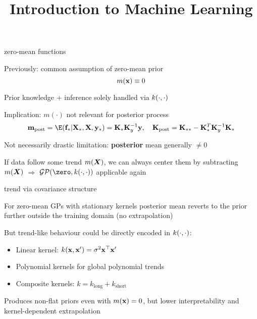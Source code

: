 \documentclass[11pt,compress,t,notes=noshow, xcolor=table]{beamer}
\title{Introduction to Machine Learning}
\begin{document}


\begin{framei}[sep=L]{zero-mean functions}
\item Previously: common assumption of zero-mean prior $$m(\mathbf{x}) \equiv 0$$
\item Prior knowledge + inference solely handled via $k(\cdot, \cdot)$
\item Implication: $m(\cdot)$ not relevant for posterior process
$$\mv_{\text{post}} = \E(\fs | \Xs, \Xmat, \ys) = \Ks \Ky^{-1} \yv, \quad \Kmat_{\text{post}} = \Kss - \Ks^T \Ky^{-1} \Ks$$
\item Not necessarily drastic limitation: \textbf{posterior} mean generally $\neq 0$
\item If data follow some trend $m(\bm{X})$, we can always center them by subtracting $m(\bm{X})$ $\Rightarrow$ $\GPzk$ applicable again
\end{framei}



\begin{framei}[sep=S]{trend via covariance structure}
\item For zero-mean GPs with stationary kernels posterior mean reverts to the prior further outside the training domain (no extrapolation)
\item But trend-like behaviour could be directly encoded in $k(\cdot, \cdot)$:
\begin{itemize}
  \item Linear kernel: $k(\mathbf{x},\mathbf{x}')=\sigma^2 \mathbf{x}^\top \mathbf{x}'$
  \item Polynomial kernels for global polynomial trends
  \item Composite kernels: $k = k_{\text{long}} + k_{\text{short}}$
\end{itemize}
\item Produces non-flat priors even with $m(\mathbf{x})=0$, but lower interpretability and kernel-dependent extrapolation

\vfill


\end{framei}
\end{document}
